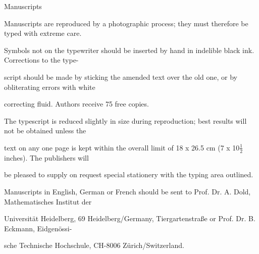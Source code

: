\noindent
Manuscripts\par
Manuscripts are reproduced by a photographic process; they must therefore be typed with extreme care.\par
Symbols not on the typewriter should be inserted by hand in indelible black ink. Corrections to the type-\par
script should be made by sticking the amended text over the old one, or by obliterating errors with white\par
correcting fluid. Authors receive 75 free copies.\par
The typescript is reduced slightly in size during reproduction; best results will not be obtained unless the\par
text on any one page is kept within the overall limit of 18 x 26.5 cm (7 x 10\ensuremath{\tfrac12} inches). The publishers will\par
be pleased to supply on request special stationery with the typing area outlined.\par
Manuscripts in English, German or French should be sent to Prof. Dr. A. Dold, Mathematisches Institut der\par
Universität Heidelberg, 69 Heidelberg/Germany, Tiergartenstraße or Prof. Dr. B. Eckmann, Eidgenössi-\par
sche Technische Hochschule, CH-8006 Zürich/Switzerland.\par

